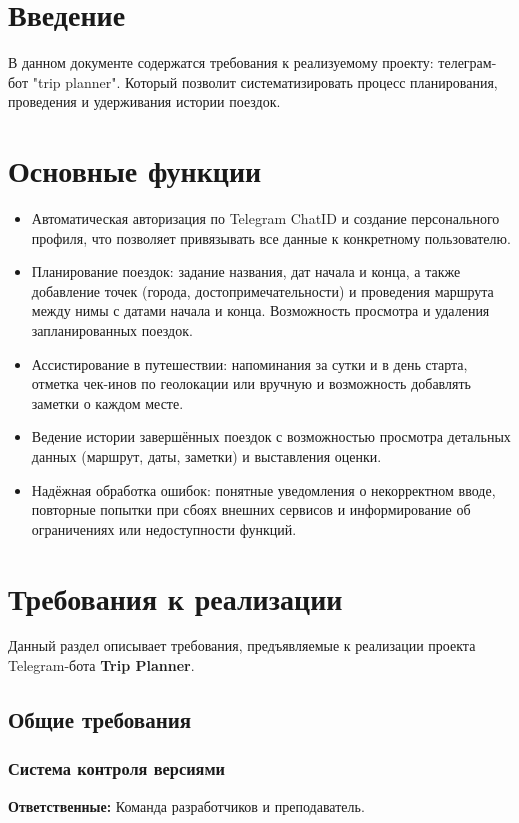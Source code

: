 \documentclass[areasetadvanced]{scrartcl}
\begin{document}
\renewcommand{\contentsname}{}
\sloppy
\tableofcontents
\newpage

\section*{Введение}
В данном документе содержатся требования к реализуемому проекту: телеграм-бот "trip planner".
Который позволит систематизировать процесс планирования, проведения и удерживания истории поездок.

\newpage
\section{Основные функции}
\begin{itemize}
  \item Автоматическая авторизация по Telegram ChatID и создание персонального профиля, что позволяет привязывать все данные к конкретному пользователю.
  \item Планирование поездок: задание названия, дат начала и конца, а также добавление точек (города, достопримечательности) и проведения маршрута между нимы с датами начала и конца.  Возможность просмотра и удаления запланированных поездок.
  \item Ассистирование в путешествии: напоминания за сутки и в день старта, отметка чек-инов по геолокации или вручную и возможность добавлять заметки о каждом месте.
  \item Ведение истории завершённых поездок с возможностью просмотра детальных данных (маршрут, даты, заметки) и выставления оценки.
  \item Надёжная обработка ошибок: понятные уведомления о некорректном вводе, повторные попытки при сбоях внешних сервисов и информирование об ограничениях или недоступности функций.
\end{itemize}
\newpage
\section{Требования к реализации}

Данный раздел описывает требования, предъявляемые к реализации проекта Telegram-бота \textbf{Trip Planner}.

\subsection{Общие требования}

\subsubsection{Система контроля версиями}
\textbf{Ответственные:} Команда разработчиков и преподаватель.
\end{document}
